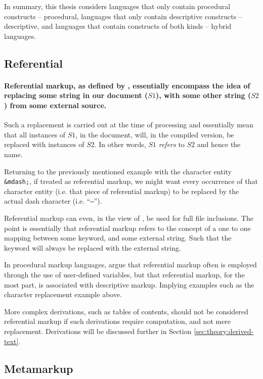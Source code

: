 \documentclass{scrreprt}
\begin{document}
In summary, this thesis considers languages that only contain procedural constructs -- procedural, languages that only contain descriptive constructs -- descriptive, and languages that contain constructs of both kinds -- hybrid languages.  


\subsection{Referential}
\label{sec:referential-markup}
\paragraph{Referential markup, as defined by \citet{coombs}, essentially encompass the idea of replacing some string in our document ($S1$), with some other string ($S2$) from some external source.} Such a replacement is carried out at the time of processing and essentially mean that all instances of $S1$, in the document, will, in the compiled version, be replaced with instances of $S2$. In other words, $S1$ \emph{refers} to $S2$ and hence the name.

Returning to the previously mentioned example with the character entity \texttt{\&mdash;}, if treated as referential markup, we might want every occurrence of that character entity (i.e. that piece of referential markup) to be replaced by the actual dash character (i.e. ``\texttt{--}'').

Referential markup can even, in the view of \citet{coombs}, be used for full file inclusions. The point is essentially that referential markup refers to the concept of a one to one mapping between some keyword, and some external string. Such that the keyword will always be replaced with the external string.

In procedural markup languages, \citet{coombs} argue that referential markup often is employed through the use of user-defined variables, but that referential markup, for the most part, is associated with descriptive markup. Implying examples such as the character replacement example above.

More complex derivations, such as tables of contents, should not be considered referential markup if such derivations require computation, and not mere replacement. Derivations will be discussed further in Section \ref{sec:theory:derived-text}.





\subsection{Metamarkup}
\end{document}
